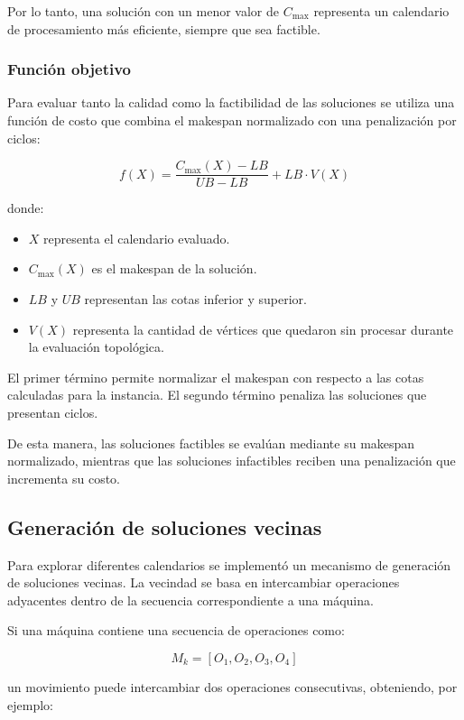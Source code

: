 \documentclass[12pt,a4paper]{article}
\begin{document}
Por lo tanto, una solución con un menor valor de $C_{\max}$ representa un calendario de procesamiento más eficiente, siempre que sea factible.

\subsubsection{Función objetivo}

Para evaluar tanto la calidad como la factibilidad de las soluciones se utiliza una función de costo que combina el makespan normalizado con una penalización por ciclos:

\[
f(X) =
\frac{C_{\max}(X)-LB}{UB-LB}
+
LB \cdot V(X)
\]

donde:

\begin{itemize}
    \item $X$ representa el calendario evaluado.
    \item $C_{\max}(X)$ es el makespan de la solución.
    \item $LB$ y $UB$ representan las cotas inferior y superior.
    \item $V(X)$ representa la cantidad de vértices que quedaron
    sin procesar durante la evaluación topológica.
\end{itemize}

El primer término permite normalizar el makespan con respecto a las cotas calculadas para la instancia. El segundo término penaliza las soluciones que presentan ciclos.

De esta manera, las soluciones factibles se evalúan mediante su makespan normalizado, mientras que las soluciones infactibles reciben una penalización que incrementa su costo.

\subsection{Generación de soluciones vecinas}

Para explorar diferentes calendarios se implementó un mecanismo de generación de soluciones vecinas. La vecindad se basa en intercambiar operaciones adyacentes dentro de la secuencia correspondiente a una máquina.

Si una máquina contiene una secuencia de operaciones como:

\[
M_k = [O_1,O_2,O_3,O_4]
\]

un movimiento puede intercambiar dos operaciones consecutivas, obteniendo, por ejemplo:
\end{document}
